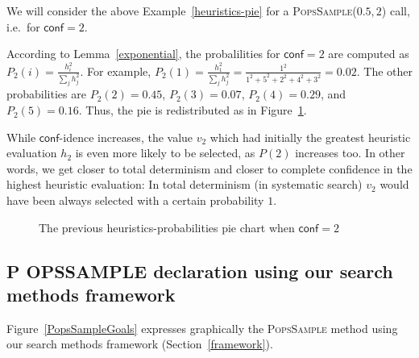 \documentclass{ws-ijait}
\begin{document}
\begin{example}
  \label{heuristics-pie2}
  We will consider the above Example~\ref{heuristics-pie}
  for a \textsc{PopsSample}($0.5, 2$) call, i.e.\ for
  $\mathsf{conf} = 2$.

  According to Lemma~\ref{exponential}, the probalilities
  for $\mathsf{conf} = 2$ are computed as $P_2(i) =
  \frac{h_i^2}{\sum_j h_j^2}$. For example, $P_2(1) =
  \frac{h_1^2}{\sum_j h_j^2} = \frac{1^2}{1^2 + 5^2 + 2^2 +
  4^2 + 3^2} = 0.02$. The other probabilities are $P_2(2) =
  0.45$, $P_2(3) = 0.07$, $P_2(4) = 0.29$, and $P_2(5) =
  0.16$. Thus, the pie is redistributed as in
  Figure~\ref{piechart2}.

  While $\mathsf{conf}$-idence increases, the value $v_2$
  which had initially the greatest heuristic evaluation
  $h_2$ is even more likely to be selected, as $P(2)$
  increases too. In other words, we get closer to total
  determinism and closer to complete confidence in the
  highest heuristic evaluation: In total determinism (in
  systematic search) $v_2$ would have been always selected
  with a certain probability $1$.
\end{example}

\begin{figure}
  \centering
  
  \caption{The previous heuristics-probabilities pie chart
           when $\mathsf{conf} = 2$\label{piechart2}}
\end{figure}

\newcommand{\PoPS}{\textbf{\normalsize P\footnotesize
                           O\normalsize PS}}
\newcommand{\PopsSample}{\textbf{\normalsize P\footnotesize
                       OPS\normalsize S\footnotesize AMPLE}}

\subsection{\PopsSample{} declaration using our search
            methods framework}

Figure~\ref{PopsSampleGoals} expresses graphically the
\textsc{PopsSample} method using our search methods
framework (Section~\ref{framework}).
\end{document}

